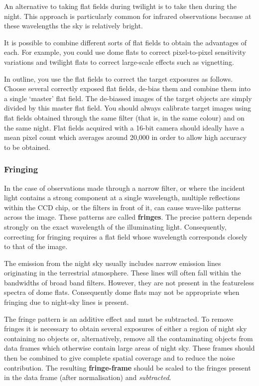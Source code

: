 \documentclass[twoside,11pt]{article}
\begin{document}
\begin{description}
   An alternative to taking flat fields during twilight is to take then
   during the night.  This approach is particularly common for infrared
   observations because at these wavelengths the sky is relatively bright.

\end{description}

It is possible to combine different sorts of flat fields to obtain the
advantages of each.  For example, you could use dome flats to correct
pixel-to-pixel sensitivity variations and twilight flats to correct
large-scale effects such as vignetting.

In outline, you use the flat fields to correct the target exposures
as follows.  Choose several correctly exposed flat fields, de-bias
them and combine them into a single `master' flat field.  The de-biassed
images of the target objects are simply divided by this master flat
field.  You should always calibrate target images using flat fields
obtained through the same filter (that is, in the same colour) and on the
same night.  Flat fields acquired with a 16-bit camera should ideally
have a mean pixel count which averages around 20,000 in order to allow
high accuracy to be obtained.

\subsubsection{Fringing}

In the case of observations made through a narrow filter, or where the
incident light contains a strong component at a single wavelength,
multiple reflections within the CCD chip, or the filters in front of it,
can cause wave-like patterns across the image.  These patterns are
called {\bf fringes}.  The precise pattern depends strongly on the 
exact wavelength of the illuminating light.  Consequently, correcting for 
fringing requires a flat field whose wavelength corresponds closely to that
of the image.

The emission from the night sky usually includes narrow emission lines
originating in the terrestrial atmosphere.  These lines will often fall
within the bandwidths of broad band filters.  However, they are not present
in the featureless spectra of dome flats.  Consequently dome flats may
not be appropriate when fringing due to night-sky lines is present.

The fringe pattern is an additive effect and must be subtracted. To
remove fringes it is necessary to obtain several exposures of either a
region of night sky containing no objects or, alternatively, remove all
the contaminating objects from data frames which otherwise contain large
areas of night sky.  These frames should then be combined to give complete
spatial coverage and to reduce the noise contribution.  The resulting
{\bf fringe-frame} should be scaled to the fringes present in the data
frame (after normalisation) and {\it subtracted}.
\end{document}
